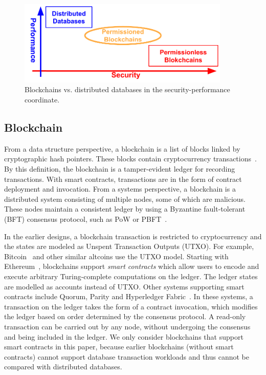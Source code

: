 \begin{figure}
    \centering
    \includegraphics[width=0.9\textwidth]{diagram/twin/spectrum.pdf}
    \caption{Blockchains vs. distributed databases in the security-performance coordinate.}
    \label{diagram:twin:spectrum} 
\end{figure}

\subsection{Blockchain}
From a data structure perspective, a blockchain is a list of blocks linked by cryptographic hash pointers. These blocks contain cryptocurrency transactions~\cite{nakamoto2019bitcoin}. By this definition, the blockchain is a tamper-evident ledger for recording transactions. With smart contracts, transactions are in the form of contract deployment and invocation.
From a systems perspective, a blockchain is a distributed system consisting of multiple nodes, some of which are malicious. These nodes maintain a consistent ledger by using a Byzantine fault-tolerant (BFT) consensus protocol, such as PoW or PBFT~\cite{castro1999practical}.

In the earlier designs, a blockchain transaction is restricted to cryptocurrency and the states are modeled
as Unspent Transaction Outputs (UTXO).  For example, Bitcoin~\cite{nakamoto2019bitcoin} and other similar
altcoins use the UTXO model.  Starting with Ethereum~\cite{wood2014ethereum}, blockchains support \textit{smart
contracts} which allow users to encode and execute arbitrary Turing-complete computations on the ledger. The ledger states are modelled as accounts instead of UTXO. 
Other systems supporting smart contracts include Quorum, Parity and Hyperledger Fabric~\cite{androulaki2018hyperledger}.  In these systems, a transaction on the ledger takes the form of a contract invocation, which modifies the ledger based on order determined by the consensus protocol. A read-only transaction can be carried out by any node, without undergoing the consensus and being included in the ledger. We only consider blockchains that support smart contracts in this paper, because earlier blockchains (without smart contracts) cannot support database transaction workloads and thus cannot be compared with distributed databases.

